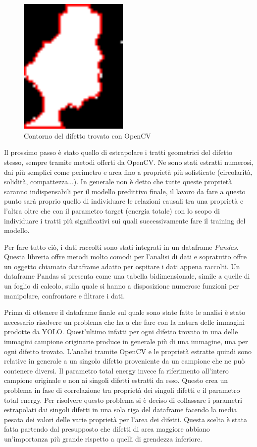 \documentclass[12pt,a4paper,openright,twoside]{report}
\begin{document}
\begin{figure}[h]
\centering
\includegraphics[width=200px,keepaspectratio]{graphene_67_bonds_cropped_box_1_thresh_countour_.png}
\caption{Contorno del difetto trovato con OpenCV}
\end{figure}
Il prossimo passo è stato quello di estrapolare i tratti geometrici del difetto stesso, sempre tramite metodi offerti da OpenCV. Ne sono stati estratti numerosi, dai più semplici come perimetro e area fino a proprietà più sofisticate (circolarità, solidità, compattezza...).
In generale non è detto che tutte queste proprietà saranno indispensabili per il modello predittivo finale, il lavoro da fare a questo punto sarà proprio quello di individuare le relazioni causali tra una proprietà e l'altra oltre che con il parametro target (energia totale) con lo scopo di individuare i tratti più significativi sui quali successivamente fare il training del modello.

Per fare tutto ciò, i dati raccolti sono stati integrati in un dataframe \emph{Pandas}. Questa libreria offre metodi molto comodi per l'analisi di dati e sopratutto offre un oggetto chiamato dataframe adatto per ospitare i dati appena raccolti. 
Un dataframe Pandas si presenta come una tabella bidimensionale, simile a quelle di un foglio di calcolo, sulla quale si hanno a disposizione numerose funzioni per manipolare, confrontare e filtrare i dati. 

Prima di ottenere il dataframe finale sul quale sono state fatte le analisi è stato necessario risolvere un problema che ha a che fare con la natura delle immagini prodotte da YOLO. Quest'ultimo infatti per ogni difetto trovato in una delle immagini campione originarie produce in generale più di una immagine, una per ogni difetto trovato. L'analisi tramite OpenCV e le proprietà estratte quindi sono relative in generale a un singolo difetto proveniente da un campione che ne può contenere diversi. Il parametro total energy invece fa riferimento all'intero campione originale e non ai singoli difetti estratti da esso. Questo crea un problema in fase di correlazione tra proprietà dei singoli difetti e il  parametro total energy. 
Per risolvere questo problema si è deciso di collassare i parametri estrapolati dai singoli difetti in una sola riga del dataframe facendo la media pesata dei valori delle varie proprietà per l'area dei difetti. 
Questa scelta è stata fatta partendo dal presupposto che difetti di area maggiore abbiano un'importanza più grande rispetto a quelli di grendezza inferiore. 
\end{document}
